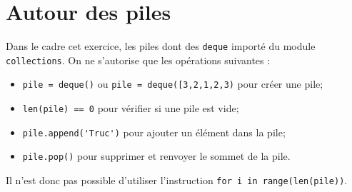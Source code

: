 \section*{Autour des piles}

Dans le cadre cet exercice, les piles dont des \lstinline{deque} importé du module \lstinline{collections}.
On ne s'autorise que les opérations suivantes : 
\begin{itemize}
 \item \lstinline{pile = deque()} ou \lstinline{pile = deque([3,2,1,2,3)} pour créer une pile;
 \item \lstinline{len(pile) == 0} pour vérifier si une pile est vide;
 \item \lstinline{pile.append('Truc')} pour ajouter un élément dans la pile;
 \item \lstinline{pile.pop()} pour supprimer et renvoyer le sommet de la pile.
\end{itemize}
Il n'est donc pas possible d'utiliser l'instruction \lstinline{for i in range(len(pile))}. 




